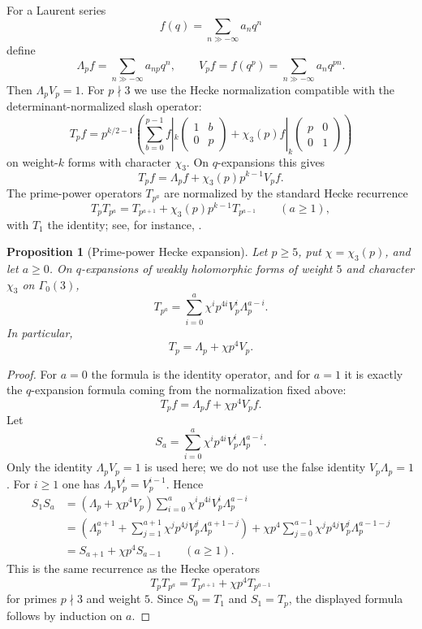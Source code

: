 \documentclass[11pt]{amsart}
\newtheorem{proposition}[theorem]{Proposition}
\theoremstyle{remark}
\newcommand{\G}{\Gamma_0(3)}
\newcommand{\Up}{\Lambda_p}
\newcommand{\Vp}{V_p}
\begin{document}
For a Laurent series
\[
 f(q)=\sum_{n\gg-\infty}a_nq^n
\]
define
\[
 \Up f=\sum_{n\gg-\infty}a_{np}q^n,
 \qquad
 \Vp f=f(q^p)=\sum_{n\gg-\infty}a_nq^{pn}.
\]
Then $\Up\Vp=1$.
For $p\nmid3$ we use the Hecke normalization compatible with the determinant-normalized slash operator:
\[
 T_pf
 =p^{k/2-1}\left(
 \sum_{b=0}^{p-1}f|_k\begin{pmatrix}1&b\\0&p\end{pmatrix}
 +\chi_3(p)f|_k\begin{pmatrix}p&0\\0&1\end{pmatrix}
 \right)
\]
on weight-$k$ forms with character $\chi_3$.  On $q$-expansions this gives
\[
 T_pf=\Up f+\chi_3(p)p^{k-1}\Vp f.
\]
The prime-power operators $T_{p^a}$ are normalized by the standard Hecke recurrence
\[
 T_pT_{p^a}=T_{p^{a+1}}+\chi_3(p)p^{k-1}T_{p^{a-1}}\qquad(a\ge1),
\]
with $T_1$ the identity; see, for instance, \cite[Chapter 4]{Miyake}.

\begin{proposition}[Prime-power Hecke expansion]\label{prop:hecke-prime-power}
Let $p\ge5$, put $\chi=\chi_3(p)$, and let $a\ge0$.  On $q$-expansions of weakly holomorphic forms of weight $5$ and character $\chi_3$ on $\G$,
\[
 T_{p^a}=
 \sum_{i=0}^{a}\chi^i p^{4i}\Vp^i\Up^{a-i}.
\]
In particular,
\[
 T_p=\Up+\chi p^4\Vp.
\]
\end{proposition}

\begin{proof}
For $a=0$ the formula is the identity operator, and for $a=1$ it is exactly the $q$-expansion formula coming from the normalization fixed above:
\[
 T_p f=\Up f+\chi p^4\Vp f.
\]
Let
\[
 S_a=\sum_{i=0}^{a}\chi^i p^{4i}\Vp^i\Up^{a-i}.
\]
Only the identity $\Up\Vp=1$ is used here; we do not use the false identity $\Vp\Up=1$.  For $i\ge1$ one has $\Up\Vp^i=\Vp^{i-1}$.  Hence
\[
\begin{aligned}
 S_1S_a
 &= (\Up+\chi p^4\Vp)
 \sum_{i=0}^{a}\chi^ip^{4i}\Vp^i\Up^{a-i} \\
 &=\left(\Up^{a+1}+\sum_{j=1}^{a+1}\chi^jp^{4j}\Vp^j\Up^{a+1-j}\right)
 +\chi p^4\sum_{j=0}^{a-1}\chi^jp^{4j}\Vp^j\Up^{a-1-j} \\
 &=S_{a+1}+\chi p^4S_{a-1}\qquad(a\ge1).
\end{aligned}
\]
This is the same recurrence as the Hecke operators
\[
 T_pT_{p^a}=T_{p^{a+1}}+\chi p^4T_{p^{a-1}}
\]
for primes $p\nmid3$ and weight $5$.  Since $S_0=T_1$ and $S_1=T_p$, the displayed formula follows by induction on $a$.
\end{proof}
\end{document}
